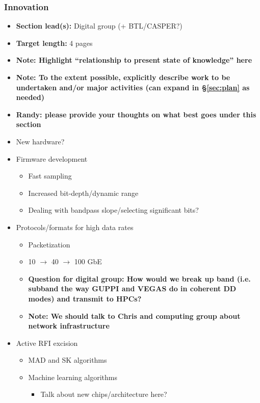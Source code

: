 \documentclass[10pt]{NSF}
\begin{document}
\subsubsection{Innovation}
\label{sec:innovation}

\begin{itemize}
\item{\textbf{Section lead(s):} Digital group (+ BTL/CASPER?)}
\item{\textbf{Target length:} 4 pages}
\item{\textbf{Note: Highlight ``relationship to present state of
      knowledge'' here}}
\item{\textbf{Note: To the extent possible, explicitly describe work
      to be undertaken and/or major activities (can expand in
      \S\ref{sec:plan} as needed)}}
\item{\textbf{Randy: please provide your thoughts on what best goes
      under this section}}
\item{New hardware?}
\item{Firmware development}
  \begin{itemize}
  \item{Fast sampling}
  \item{Increased bit-depth/dynamic range}
  \item{Dealing with bandpass slope/selecting significant bits?}
  \end{itemize}
\item{Protocols/formats for high data rates}
  \begin{itemize}
  \item{Packetization}
  \item{10 $\rightarrow$ 40 $\rightarrow$ 100 GbE}
  \item{\textbf{Question for digital group: How would we break up band
        (i.e. subband the way GUPPI and VEGAS do in coherent DD modes)
        and transmit to HPCs?}}
  \item{\textbf{Note: We should talk to Chris and computing group
        about network infrastructure}}
  \end{itemize}
\item{Active RFI excision}
  \begin{itemize}
  \item{MAD and SK algorithms}
  \item{Machine learning algorithms}
    \begin{itemize}
    \item{Talk about new chips/architecture here?}
    \end{itemize}

\end{itemize}
\end{itemize}
\end{document}
